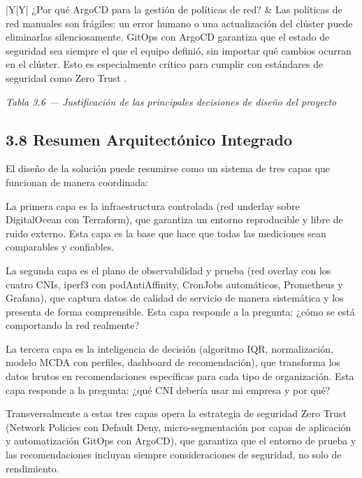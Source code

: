 \documentclass[journal]{IEEEtran}
\begin{document}
\begin{table}[htbp]
\begin{tabularx}{\textwidth}{|Y|Y|}
¿Por qué ArgoCD para la gestión de políticas de red? & Las políticas de red manuales son frágiles: un error humano o una actualización del clúster puede eliminarlas silenciosamente. GitOps con ArgoCD garantiza que el estado de seguridad sea siempre el que el equipo definió, sin importar qué cambios ocurran en el clúster. Esto es especialmente crítico para cumplir con estándares de seguridad como Zero Trust \cite{ref25}. \\
\hline
\end{tabularx}
\end{table}

\begin{center}\emph{\emph{Tabla 3.6 --- Justificación de las principales decisiones de diseño del proyecto}}\end{center}

\subsection{3.8 Resumen Arquitectónico Integrado}

El diseño de la solución puede resumirse como un sistema de tres capas que funcionan de manera coordinada:

La primera capa es la infraestructura controlada (red underlay sobre DigitalOcean con Terraform), que garantiza un entorno reproducible y libre de ruido externo. Esta capa es la base que hace que todas las mediciones sean comparables y confiables.

La segunda capa es el plano de observabilidad y prueba (red overlay con los cuatro CNIs, iperf3 con podAntiAffinity, CronJobs automáticos, Prometheus y Grafana), que captura datos de calidad de servicio de manera sistemática y los presenta de forma comprensible. Esta capa responde a la pregunta: ¿cómo se está comportando la red realmente?

La tercera capa es la inteligencia de decisión (algoritmo IQR, normalización, modelo MCDA con perfiles, dashboard de recomendación), que transforma los datos brutos en recomendaciones específicas para cada tipo de organización. Esta capa responde a la pregunta: ¿qué CNI debería usar mi empresa y por qué?

Transversalmente a estas tres capas opera la estrategia de seguridad Zero Trust (Network Policies con Default Deny, micro-segmentación por capas de aplicación y automatización GitOps con ArgoCD), que garantiza que el entorno de prueba y las recomendaciones incluyan siempre consideraciones de seguridad, no solo de rendimiento.
\end{document}
